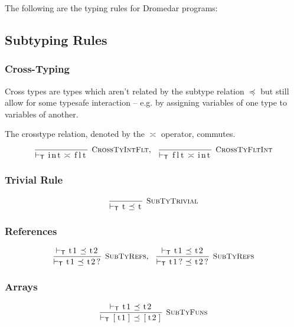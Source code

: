 \documentclass{article}
\newcommand{\code}[1]{\lstinline[columns=fixed]{#1}}
\newcommand{\drmrule}[5]{\frac{#1}{#2\vdash_{\mathsf{#3}}#4}\textsc{\ \small{#5}}}
\newcommand{\ruleapp}[1]{\vdash_{\mathsf{#1}}}
\newcommand{\mc}[1]{\textnormal{\code{#1}}}
\begin{document}
		The following are the typing rules for Dromedar programs:
		
		\subsection{Subtyping Rules}
		
			\subsubsection{Cross-Typing}
			
				Cross types are types which aren't related by the subtype relation $\preceq$ but still allow for some typesafe interaction -- e.g. by assigning variables of one type to variables of another.
				
				The crosstype relation, denoted by the $\asymp$ operator, commutes.
				\begin{align*}
					\drmrule{}{}{T}{\mc{int} \asymp \mc{flt}}{CrossTyIntFlt},\ \ 
					\drmrule{}{}{T}{\mc{flt} \asymp \mc{int}}{CrossTyFltInt}
				\end{align*}
		
			\subsubsection{Trivial Rule}
			
				\begin{align*}
					\drmrule{}{}{T}{\mc{t} \preceq \mc{t}}{SubTyTrivial}
				\end{align*}
				
			\subsubsection{References}
			
				\begin{align*}
					\drmrule{\ruleapp{T}\mc{t1} \preceq \mc{t2}}{}{T}{\mc{t1} \preceq \mc{t2?}}{SubTyRefs},\ \ 
					\drmrule{\ruleapp{T}\mc{t1}\preceq\mc{t2}}{}{T}{\mc{t1?} \preceq \mc{t2?}}{SubTyRefs}
				\end{align*}
				
			\subsubsection{Arrays}
			
				\begin{align*}
					\drmrule{\ruleapp{T}\mc{t1}\preceq\mc{t2}}{}{T}{\mc{[t1]}\preceq\mc{[t2]}}{SubTyFuns}
				\end{align*}
		
\end{document}
